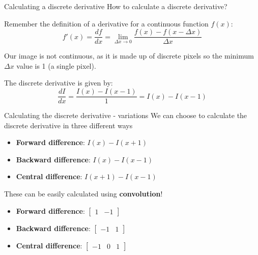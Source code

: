 \documentclass[9pt, aspectratio=169]{beamer}
\begin{document}
\begin{frame}
    {Calculating a discrete derivative}
    How to calculate a discrete derivative?

    Remember the definition of a derivative for a continuous function $f(x)$:
    $$f'(x) = \frac{df}{dx} = \lim_{\Delta x \rightarrow 0} \frac{f(x) - f(x - \Delta x)}{\Delta x}$$

    \pause
    Our image is not continuous, as it is made up of discrete pixels so the minimum $\Delta x$ value is 1 (a single pixel).

    \pause
    The discrete derivative is given by:
    \Large{
        $$\frac{dI}{dx} = \frac{I(x) - I(x-1)}{1} = I(x) - I(x-1)$$}
\end{frame}

\begin{frame}
    {Calculating the discrete derivative - variations}
    We can choose to calculate the discrete derivative in three different ways

    \Large
    \begin{itemize}
        \item \textbf{Forward difference}: $I(x) - I(x+1)$
        \item \textbf{Backward difference}: $I(x) - I(x-1)$
        \item \textbf{Central difference}: $I(x+1) - I(x-1)$
    \end{itemize}

    \pause
    These can be easily calculated using \textbf{convolution}!

    \begin{itemize}
        \item \textbf{Forward difference}: $\begin{bmatrix}1&-1\end{bmatrix}$
        \item \textbf{Backward difference}: $\begin{bmatrix}-1&1\end{bmatrix}$
        \item \textbf{Central difference}: $\begin{bmatrix}-1&0&1\end{bmatrix}$
    \end{itemize}
\end{frame}
\end{document}
